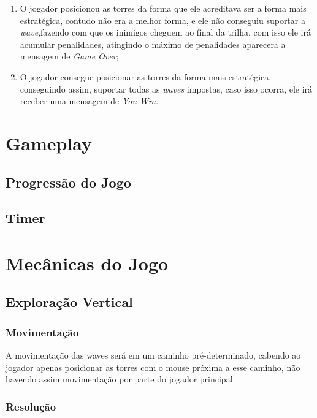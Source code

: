 \documentclass[11pt]{article} %
\begin{document}
\begin{enumerate}
\item O jogador posicionou as torres da forma que ele acreditava ser a forma mais estratégica, contudo não era a melhor forma, e ele não conseguiu suportar a \textit{wave},fazendo com que os inimigos cheguem ao final da trilha, com isso ele irá acumular penalidades, atingindo o máximo de penalidades aparecera a mensagem de \textit{Game Over};
\item O jogador consegue posicionar as torres da forma mais estratégica, conseguindo assim, suportar todas as \textit{waves} impostas, caso isso ocorra, ele irá receber uma mensagem de \textit{You Win}.

\end{enumerate}

\section{Gameplay}

\subsection{Progressão do Jogo}

\subsection{Timer}

\newpage

\section{Mecânicas do Jogo}

\subsection{Exploração Vertical}

\subsubsection{Movimentação}
A movimentação das waves será em um caminho pré-determinado, cabendo ao jogador apenas posicionar as torres com o mouse próxima a esse caminho, não havendo assim movimentação por parte do jogador principal.

\subsubsection{Resolução}
\newpage
\end{document}
